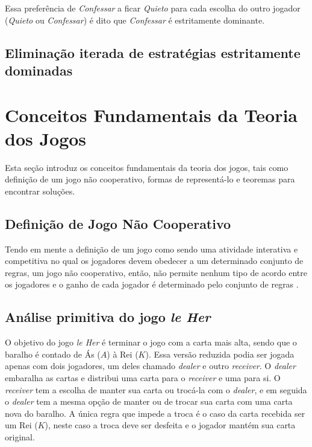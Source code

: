 Essa preferência de \emph{\color{blue}Confessar} a ficar \emph{\color{blue}Quieto} para cada escolha do outro jogador (\emph{\color{red}Quieto} ou \emph{\color{red}Confessar}) é dito que \emph{\color{blue}Confessar} é estritamente dominante.

\subsection{Eliminação iterada de estratégias estritamente dominadas}


\section{Conceitos Fundamentais da Teoria dos Jogos}
\label{sec:conceitos-fundamentais-da-teoria-dos-jogos}

Esta seção introduz os conceitos fundamentais da teoria dos jogos, tais como definição de um jogo não cooperativo, formas de representá-lo e teoremas para encontrar soluções.

\subsection{Definição de Jogo Não Cooperativo}
\label{subsec:definicao-de-jogo-nao-cooperativo}

Tendo em mente a definição de um jogo como sendo uma atividade interativa e competitiva no qual os jogadores devem obedecer a um determinado conjunto de regras, um jogo não cooperativo, então, não permite nenhum tipo de acordo entre os jogadores e o ganho de cada jogador é determinado pelo conjunto de regras \cite{jones_1980}.


\subsection{Análise primitiva do jogo \emph{le Her}}
\label{subsec:analise-primitiva-do-jogo-le-her}

O objetivo do jogo \emph{le Her} é terminar o jogo com a carta mais alta, sendo que o baralho é contado de Ás ($A$) à Rei ($K$). Essa versão reduzida podia ser jogada apenas com dois jogadores, um deles chamado \emph{dealer} e outro \emph{receiver}. O \emph{dealer} embaralha as cartas e distribui uma carta para o \emph{receiver} e uma para si. O \emph{receiver} tem a escolha de manter sua carta ou trocá-la com o \emph{dealer}, e em seguida o \emph{dealer} tem a mesma opção de manter ou de trocar sua carta com uma carta nova do baralho. A única regra que impede a troca é o caso da carta recebida ser um Rei ($K$), neste caso a troca deve ser desfeita e o jogador mantém sua carta original.


